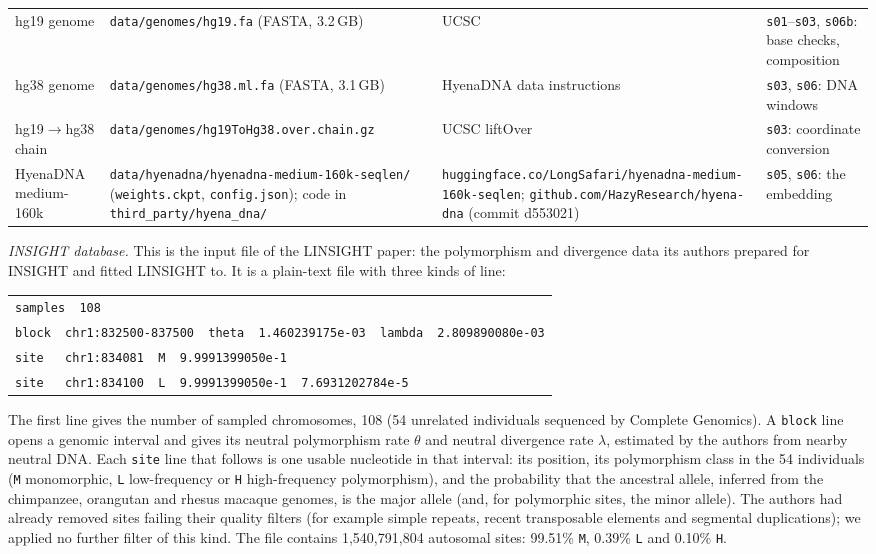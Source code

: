 \documentclass[11pt]{article}
\newcommand{\file}[1]{\nolinkurl{#1}}
\begin{document}
\begin{table}[t]
\begin{tabularx}{\textwidth}{@{}>{\raggedright\arraybackslash}p{2.55cm} >{\raggedright\arraybackslash}X >{\raggedright\arraybackslash}p{3.6cm} >{\raggedright\arraybackslash}p{3.0cm}@{}}
hg19 genome & \file{data/genomes/hg19.fa} (FASTA, 3.2\,GB) & UCSC & \file{s01}--\file{s03}, \file{s06b}: base checks, composition \\
hg38 genome & \file{data/genomes/hg38.ml.fa} (FASTA, 3.1\,GB) & HyenaDNA data instructions & \file{s03}, \file{s06}: DNA windows \\
hg19$\to$hg38 chain & \file{data/genomes/hg19ToHg38.over.chain.gz} & UCSC liftOver & \file{s03}: coordinate conversion \\
HyenaDNA medium-160k & \file{data/hyenadna/hyenadna-medium-160k-seqlen/} (\file{weights.ckpt}, \file{config.json}); code in \file{third_party/hyena_dna/} & \file{huggingface.co/LongSafari/hyenadna-medium-160k-seqlen}; \file{github.com/HazyResearch/hyena-dna} (commit d553021) & \file{s05}, \file{s06}: the embedding \\
\bottomrule
\end{tabularx}
\end{table}

\emph{INSIGHT database.} This is the input file of the LINSIGHT paper: the
polymorphism and divergence data its authors prepared for INSIGHT and fitted
LINSIGHT to. It is a plain-text file with three kinds of line:
\begin{center}\footnotesize
\begin{tabular}{@{}l@{}}
\texttt{samples\ \ 108}\\
\texttt{block\ \ chr1:832500-837500\ \ theta\ \ 1.460239175e-03\ \ lambda\ \ 2.809890080e-03}\\
\texttt{site\ \ \ chr1:834081\ \ M\ \ 9.9991399050e-1}\\
\texttt{site\ \ \ chr1:834100\ \ L\ \ 9.9991399050e-1\ \ 7.6931202784e-5}
\end{tabular}
\end{center}
The first line gives the number of sampled chromosomes, 108 (54 unrelated individuals sequenced by Complete
Genomics). A \texttt{block} line opens a genomic interval and gives its neutral
polymorphism rate $\theta$ and neutral divergence rate $\lambda$, estimated by the authors from nearby
neutral DNA. Each \texttt{site} line that follows is one usable nucleotide in that interval: its position,
its polymorphism class in the 54 individuals (\texttt{M} monomorphic, \texttt{L} low-frequency or \texttt{H}
high-frequency polymorphism), and the probability that the ancestral allele, inferred from the chimpanzee,
orangutan and rhesus macaque genomes, is the major allele (and, for polymorphic sites, the minor allele). The
authors had already removed sites failing their quality filters (for example simple repeats, recent
transposable elements and segmental duplications); we applied no further filter
of this kind. The file contains 1,540,791,804 autosomal sites: 99.51\% \texttt{M}, 0.39\% \texttt{L} and
0.10\% \texttt{H}.
\end{document}
